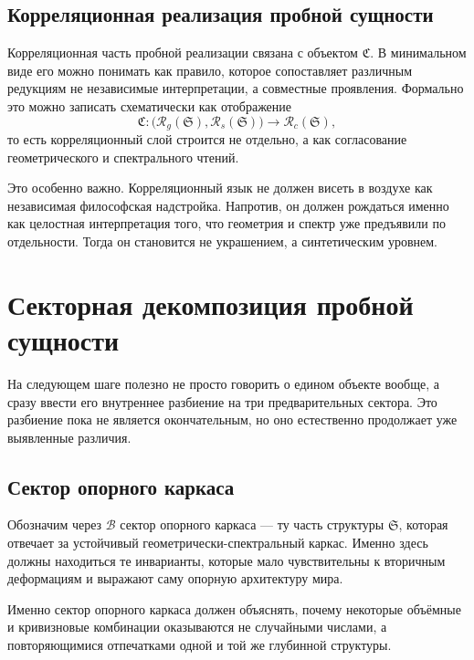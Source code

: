 \documentclass[12pt,a4paper]{article}
\begin{document}
\subsection{Корреляционная реализация пробной сущности}

Корреляционная часть пробной реализации связана с объектом \(\mathfrak{C}\). В минимальном виде его можно понимать как правило, которое сопоставляет различным редукциям не независимые интерпретации, а совместные проявления. Формально это можно записать схематически как отображение
\begin{equation}
\mathfrak{C}: \bigl(\mathcal{R}_g(\mathfrak{S}),\mathcal{R}_s(\mathfrak{S})\bigr) \longrightarrow \mathcal{R}_c(\mathfrak{S}),
\end{equation}
то есть корреляционный слой строится не отдельно, а как согласование геометрического и спектрального чтений.

Это особенно важно. Корреляционный язык не должен висеть в воздухе как независимая философская надстройка. Напротив, он должен рождаться именно как целостная интерпретация того, что геометрия и спектр уже предъявили по отдельности. Тогда он становится не украшением, а синтетическим уровнем.

\section{Секторная декомпозиция пробной сущности}

На следующем шаге полезно не просто говорить о едином объекте вообще, а сразу ввести его внутреннее разбиение на три предварительных сектора. Это разбиение пока не является окончательным, но оно естественно продолжает уже выявленные различия.

\subsection{Сектор опорного каркаса}

Обозначим через \(\mathcal{B}\) сектор опорного каркаса --- ту часть структуры \(\mathfrak{S}\), которая отвечает за устойчивый геометрически-спектральный каркас. Именно здесь должны находиться те инварианты, которые мало чувствительны к вторичным деформациям и выражают саму опорную архитектуру мира.

Именно сектор опорного каркаса должен объяснять, почему некоторые объёмные и кривизновые комбинации оказываются не случайными числами, а повторяющимися отпечатками одной и той же глубинной структуры.
\end{document}
